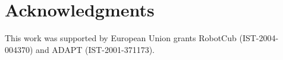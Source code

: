 \section*{Acknowledgments}
This work was supported by European Union grants RobotCub (IST-2004-004370)
and ADAPT (IST-2001-371173).
